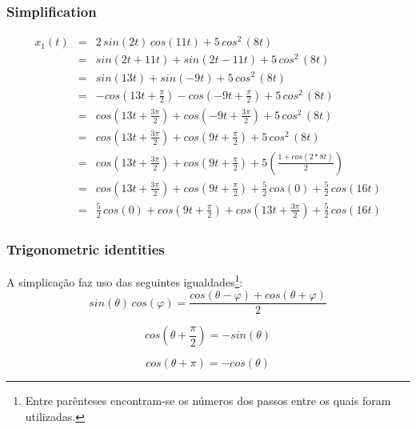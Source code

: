 \documentclass[a4paper]{article}
\begin{document}
\subsubsection{Simplification}
\begin{eqnarray}
\label{eq:simplification}
x_{1}(t) & = & 2 \, sin(2 t) \, cos(11 t) + 5 \, cos^2 \, (8t) \\
	 & = & sin(2 t + 11 t) + sin(2 t - 11 t) + 5 \, cos^2 \, (8t) \\
	 & = & sin(13 t) + sin(- 9 t) + 5 \, cos^2 \, (8t) \\
	 & = & - cos\left(13 t + \frac{\pi}{2}\right) - cos\left(- 9 t + \frac{\pi}{2}\right) + 5 \, cos^2 \, (8t) \\
	 & = & cos\left(13 t + \frac{3 \pi}{2}\right) + cos\left(- 9 t + \frac{3 \pi}{2}\right) + 5 \, cos^2 \, (8t) \\
	 & = & cos\left(13 t + \frac{3 \pi}{2}\right) + cos\left(9 t + \frac{\pi}{2}\right) + 5 \, cos^2 \, (8t) \\
	 & = & cos\left(13 t + \frac{3 \pi}{2}\right) + cos\left(9 t + \frac{\pi}{2}\right) + 5 \left(\frac{1 + cos(2 * 8 t)}{2}\right) \\
	 & = & cos\left(13 t + \frac{3 \pi}{2}\right) + cos\left(9 t + \frac{\pi}{2}\right) + \frac{5}{2} \, cos(0) + \frac{5}{2} \, cos(16 t) \\
	 & = & \frac{5}{2} \, cos(0) + cos\left(9 t + \frac{\pi}{2}\right) + cos\left(13 t + \frac{3 \pi}{2}\right) + \frac{5}{2} \, cos(16 t)
\end{eqnarray}

\subsubsection{Trigonometric identities}
\label{subsubsec:trigident}
A simplicação faz uso das seguintes igualdades\footnote{Entre parênteses encontram-se os números dos passos entre os quais foram utilizadas.}:
\begin{equation}
sin(\theta) \, cos(\varphi) = \frac{cos(\theta - \varphi) + cos(\theta + \varphi)}{2}
\tag{3 to 4}
\label{eqnarr:trigident}
\end{equation}

\begin{equation}
cos(\theta + \frac{\pi}{2}) = -sin(\theta)
\tag{5 to 6}
\end{equation}

\begin{equation}
cos(\theta + \pi) = -cos(\theta)
\tag{6 to 7}
\end{equation}
\end{document}
